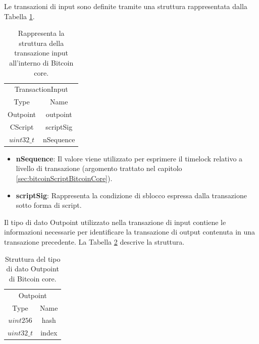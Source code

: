 Le transazioni di input sono definite tramite una struttura rappresentata dalla Tabella \ref{tab:inputtxbitcoinc}.

\begin{table}
       \centering\small
           \begin{tabular}{cc}
               \toprule
                 \multicolumn{2}{c}{TransactionInput} \\
                 \cmidrule(lr){1-2}
                 \multicolumn{1}{c}{Type} & \multicolumn{1}{c}{Name} \\
               \midrule
               Outpoint & outpoint   \\
               CScript & scriptSig \\
               $uint32\_t$ & nSequence \\
               \bottomrule
       \end{tabular}
       \caption{Rappresenta la struttura della transazione input all’interno di Bitcoin core.\label{tab:inputtxbitcoinc}}
   \end{table}

\begin{itemize}
  \item {\bf nSequence\/}:  Il valore viene utilizzato per esprimere il timelock relativo a livello di transazione (argomento trattato nel capitolo \ref{sec:bitcoinScriptBitcoinCore}).
  \item {\bf scriptSig\/}: Rappresenta la condizione di sblocco espressa dalla transazione sotto forma di script.
\end{itemize}

Il tipo di dato Outpoint utilizzato nella transazione di input contiene le informazioni necessarie per identificare la transazione di output contenuta in una transazione precedente. La Tabella \ref{tab:outpointbitcoinc} descrive la struttura.


\begin{table}
       \centering\small
           \begin{tabular}{cc}
               \toprule
                 \multicolumn{2}{c}{Outpoint} \\
                 \cmidrule(lr){1-2}
                 \multicolumn{1}{c}{Type} & \multicolumn{1}{c}{Name} \\
               \midrule
               $uint256$ & hash   \\
               $uint32\_t$ & index \\
               \bottomrule
       \end{tabular}
       \caption{Struttura del tipo di dato Outpoint di Bitcoin core.\label{tab:outpointbitcoinc}}
   \end{table}

